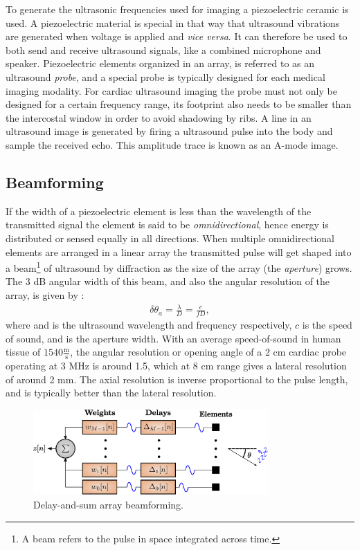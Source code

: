To generate the ultrasonic frequencies used for imaging a piezoelectric ceramic is used. A piezoelectric material is special in that way that ultrasound vibrations are generated when voltage is applied and \textit{vice versa}. It can therefore be used to both send and receive ultrasound signals, like a combined microphone and speaker. Piezoelectric elements organized in an array, is referred to as an ultrasound \textit{probe}, and a special probe is typically designed for each medical imaging modality. For cardiac ultrasound imaging the probe must not only be designed for a certain frequency range, its footprint also needs to be smaller than the intercostal window in order to avoid shadowing by ribs. A line in an ultrasound image is generated by firing a ultrasound pulse into the body and sample the received echo. This amplitude trace is known as an A-mode image. 

\subsection{Beamforming}
If the width of a piezoelectric element is less than the wavelength of the transmitted signal the element is said to be \textit{omnidirectional}, hence energy is distributed or sensed equally in all directions. When multiple omnidirectional elements are arranged in a linear array the transmitted pulse will get shaped into a beam\footnote{A beam refers to the pulse in space integrated across time.} of ultrasound by diffraction as the size of the array  (the \textit{aperture}) grows. The 3 dB angular width of this beam, and also the angular resolution of the array, is given by \cite{AngelUltrasound}:
\begin{align}\label{eq:res}
\delta\theta_a = \frac{\lambda}{D} = \frac{c}{fD},
\end{align}
where  and  is the ultrasound wavelength and frequency respectively, $c$ is the speed of sound, and  is the aperture width. With an average speed-of-sound in human tissue of $1540\frac{\text{m}}{\text{s}}$, the angular resolution or opening angle of a 2 cm cardiac probe operating at 3 MHz is around 1.5\degree, which at 8 cm range gives a lateral resolution of around 2 mm. The axial resolution is inverse proportional to the pulse length, and is typically better than the lateral resolution.

\begin{figure}
\centering
\includegraphics[width=0.8\textwidth]{img/beamforming_das.eps}
\caption{Delay-and-sum array beamforming.}
\label{fig:das}
\end{figure}

